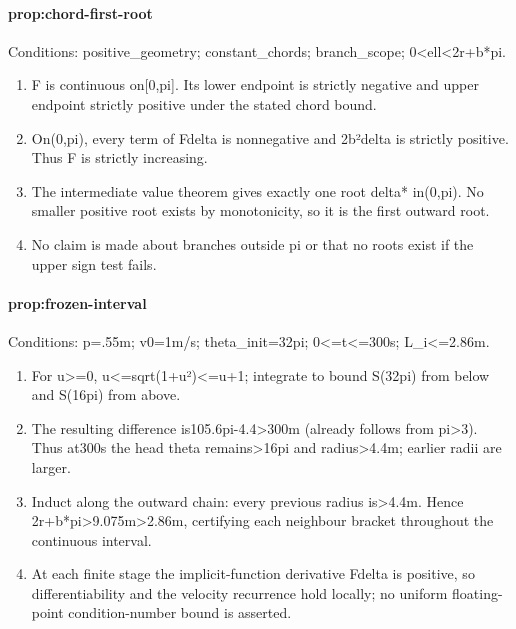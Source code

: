 \paragraph{prop:chord-first-root}
Conditions: positive\_geometry; constant\_chords; branch\_scope; 0<ell<2r+b*pi.
\begin{enumerate}
\item F is continuous on[0,pi]. Its lower endpoint is strictly negative and upper endpoint strictly positive under the stated chord bound.
\item On(0,pi), every term of Fdelta is nonnegative and 2b²delta is strictly positive. Thus F is strictly increasing.
\item The intermediate value theorem gives exactly one root delta* in(0,pi). No smaller positive root exists by monotonicity, so it is the first outward root.
\item No claim is made about branches outside pi or that no roots exist if the upper sign test fails.
\end{enumerate}
\paragraph{prop:frozen-interval}
Conditions: p=.55m; v0=1m/s; theta\_init=32pi; 0<=t<=300s; L\_i<=2.86m.
\begin{enumerate}
\item For u>=0, u<=sqrt(1+u²)<=u+1; integrate to bound S(32pi) from below and S(16pi) from above.
\item The resulting difference is105.6pi-4.4>300m (already follows from pi>3). Thus at300s the head theta remains>16pi and radius>4.4m; earlier radii are larger.
\item Induct along the outward chain: every previous radius is>4.4m. Hence 2r+b*pi>9.075m>2.86m, certifying each neighbour bracket throughout the continuous interval.
\item At each finite stage the implicit-function derivative Fdelta is positive, so differentiability and the velocity recurrence hold locally; no uniform floating-point condition-number bound is asserted.
\end{enumerate}
